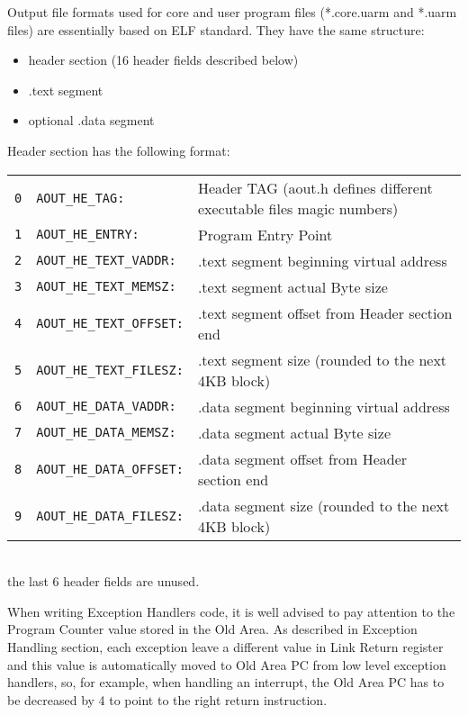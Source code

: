 
Output file formats used for core and user program files (*.core.uarm and *.uarm files) are essentially based on ELF standard. They have the same structure:
\begin{itemize}
\item header section (16 header fields described below)
\item .text segment
\item optional .data segment
\end{itemize}

Header section has the following format:
\\

\noindent
\begin{tabular}{rlp{8cm}}
\texttt{0} & \texttt{AOUT\_HE\_TAG:} & Header TAG (aout.h defines different executable files magic numbers) \\
\texttt{1} & \texttt{AOUT\_HE\_ENTRY:} & Program Entry Point \\
\texttt{2} & \texttt{AOUT\_HE\_TEXT\_VADDR:} & .text segment beginning virtual address \\
\texttt{3} & \texttt{AOUT\_HE\_TEXT\_MEMSZ:} & .text segment actual Byte size \\
\texttt{4} & \texttt{AOUT\_HE\_TEXT\_OFFSET:} & .text segment offset from Header section end \\
\texttt{5} & \texttt{AOUT\_HE\_TEXT\_FILESZ:} & .text segment size (rounded to the next 4KB block) \\
\texttt{6} & \texttt{AOUT\_HE\_DATA\_VADDR:} & .data segment beginning virtual address \\
\texttt{7} & \texttt{AOUT\_HE\_DATA\_MEMSZ:} & .data segment actual Byte size \\
\texttt{8} & \texttt{AOUT\_HE\_DATA\_OFFSET:} & .data segment offset from Header section end \\
\texttt{9} & \texttt{AOUT\_HE\_DATA\_FILESZ:} & .data segment size (rounded to the next 4KB block) \\
\end{tabular}
\\

the last 6 header fields are unused.


When writing Exception Handlers code, it is well advised to pay attention to the Program Counter value stored in the Old Area. As described in Exception Handling section, each exception leave a different value in Link Return register and this value is automatically moved to Old Area PC from low level exception handlers, so, for example, when handling an interrupt, the Old Area PC has to be decreased by 4 to point to the right return instruction.

